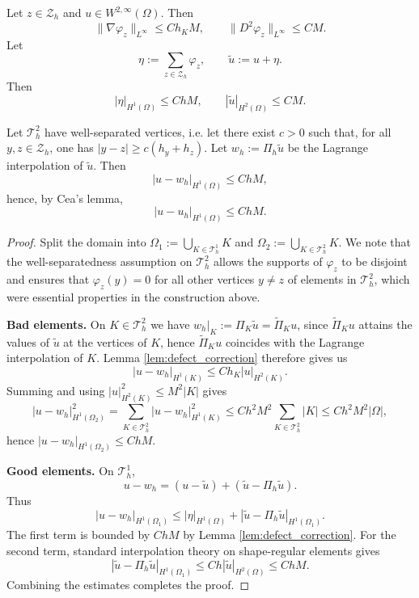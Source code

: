 \documentclass[10pt,a4paper]{amsart}
\begin{document}
\begin{lemma}
\label{lem:defect_correction}
Let $z\in\mathcal{Z}_h$ and $u\in W^{2,\infty}(\Omega)$. Then
\[
\|\nabla \varphi_z\|_{L^\infty} \le C h_K M,
\qquad
\|D^2 \varphi_z\|_{L^\infty} \le C M.
\]
Let
\[
\eta := \sum_{z \in \mathcal{Z}_h} \varphi_z,
\qquad
\widetilde{u} := u + \eta.
\]
Then
\[
|\eta|_{H^1(\Omega)} \le C h M,
\qquad
|\widetilde{u}|_{H^2(\Omega)} \le C M.
\]
\end{lemma}

\begin{theorem}
Let $\mathcal{T}_h^2$ have well-separated vertices, i.e. let there exist $c>0$ such that, for all $y,z\in \mathcal{Z}_h$, one has $|y-z|\ge c(h_y+h_z)$. Let $w_h:=\Pi_h\widetilde{u}$ be the Lagrange interpolation of $\widetilde{u}$. Then
\[
|u - w_h|_{H^1(\Omega)} \le C h M,
\]
hence, by Cea's lemma,
\[
|u - u_h|_{H^1(\Omega)} \le C h M.
\]
\end{theorem}

\begin{proof}
Split the domain into $\Omega_1 := \bigcup_{K\in \mathcal{T}_h^1} K$ and $\Omega_2 := \bigcup_{K\in \mathcal{T}_h^2} K$. We note that the well-separatedness assumption on $\mathcal{T}_h^2$ allows the supports of $\varphi_z$ to be disjoint and ensures that $\varphi_z(y) = 0$ for all other vertices $y \neq z$ of elements in $\mathcal{T}_h^2$, which were essential properties in the construction above.

\smallskip

\textbf{Bad elements.} On $K \in \mathcal{T}_h^2$ we have $w_h|_K := {\Pi}_K \widetilde{u} = \widetilde{\Pi}_K u$, since $\widetilde{\Pi}_K u$ attains the values of $\widetilde{u}$ at the vertices of $K$, hence $\widetilde{\Pi}_K u$ coincides with the Lagrange interpolation of $K$. Lemma \ref{lem:defect_correction} therefore gives us
\[
|u - w_h|_{H^1(K)} \le C h_K |u|_{H^2(K)}.
\]
Summing and using $|u|_{H^2(K)}^2\leq M^2|K|$ gives
\[
|u - w_h|_{H^1(\Omega_2)}^2=\sum_{K \in \mathcal{T}_h^2} |u - w_h|_{H^1(K)}^2\leq Ch^2M^2\sum_{K \in \mathcal{T}_h^2} |K| 
\le C h^2 M^2|\Omega|,
\]
hence $|u - w_h|_{H^1(\Omega_2)} \le C hM.$

\smallskip

\textbf{Good elements.}
On $\mathcal{T}_h^1$,
\[
u - w_h = (u - \widetilde{u}) + (\widetilde{u} - \Pi_h \widetilde{u}).
\]
Thus
\[
|u - w_h|_{H^1(\Omega_1)}
\le |\eta|_{H^1(\Omega)} + |\widetilde{u} - \Pi_h \widetilde{u}|_{H^1(\Omega_1)}.
\]
The first term is bounded by $C h M$ by Lemma \ref{lem:defect_correction}. For the second term, standard interpolation theory on shape-regular elements gives
\[
|\widetilde{u} - \Pi_h \widetilde{u}|_{H^1(\Omega_1)}
\le C h |\widetilde{u}|_{H^2(\Omega)}
\le C h M.
\]
Combining the estimates completes the proof.
\end{proof}
\end{document}
